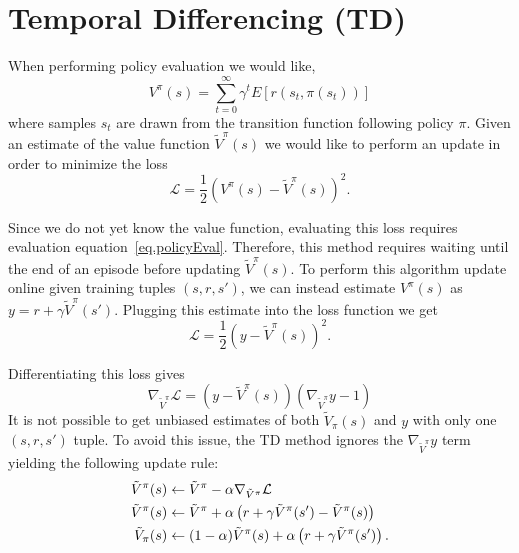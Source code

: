 \documentclass[11pt]{article}
\numberwithin{equation}{section}
\numberwithin{figure}{section}
\begin{document}
\section{Temporal Differencing (TD)}

When performing policy evaluation we would like,
\begin{equation}
	V^\pi(s) = \sum_{t = 0}^\infty \gamma^t E[r(s_t,\pi(s_t))]
	\label{eq.policyEval}
\end{equation}
where samples $s_t$ are drawn from the transition function following policy $\pi$. Given an estimate of the value function $\tilde{V}^\pi(s)$ we would like to perform an update in order to minimize the loss
\begin{equation}
	\mathcal{L} = \frac{1}{2} \left(V^\pi(s) - \tilde{V}^\pi(s) \right)^2.
	\label{eq.valUpdate}
\end{equation}

Since we do not yet know the value function, evaluating this loss requires evaluation equation~\ref{eq.policyEval}. Therefore, this method requires waiting until the end of an episode before updating $\tilde{V}^\pi(s)$. To perform this algorithm update online given training tuples $(s,r,s')$, we can instead estimate $V^\pi(s)$ as $y = r + \gamma \tilde{V}^\pi(s')$. Plugging this estimate into the loss function we get
\begin{equation}
	\mathcal{L} = \frac{1}{2} \left(y - \tilde{V}^\pi(s) \right)^2.
	\label{eq.valUpdateApprox}
\end{equation}

Differentiating this loss gives
\begin{equation}
    \nabla_{\tilde{V}^\pi}\mathcal{L} = \left(y - \tilde{V}^\pi(s) \right) \left(\nabla_{\tilde{V}^\pi} y - 1 \right)
    \label{eq:valGrad}
\end{equation}
It is not possible to get unbiased estimates of both $\tilde{V}_\pi(s)$ and $y$ with only one $(s,r,s')$ tuple. To avoid this issue, the TD method ignores the $\nabla_{\tilde{V}^\pi} y$ term yielding the following update rule:
\begin{align}
    \tilde{V}^\pi(s) &\leftarrow  \tilde{V}^\pi - \alpha \nabla_{\tilde{V}^\pi}\mathcal{L} \notag \\
    \tilde{V}^\pi(s) &\leftarrow  \tilde{V}^\pi + \alpha \left(r + \gamma \tilde{V}^\pi(s') - \tilde{V}^\pi(s) \right) \notag \\
    \tilde{V}_\pi(s) &\leftarrow  (1 - \alpha) \tilde{V}^\pi(s) + \alpha \left(r+ \gamma \tilde{V}^\pi(s') \right). 
    \label{eq:val(s)Grad}
\end{align}
\end{document}
